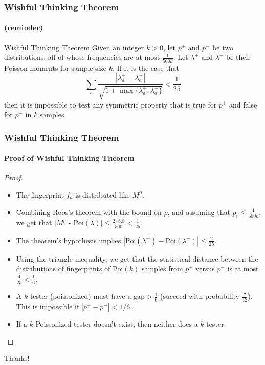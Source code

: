 \documentclass{beamer}
\begin{document}
\begin{frame}
  \frametitle{Wishful Thinking Theorem} \framesubtitle{(reminder)}

  \begin{block}{Wishful Thinking Theorem}
    Given an integer $k>0$, let $p^+$ and $p^-$ be two distributions,
    all of whose frequencies are at most $\frac{1}{500k}$. Let
    $\lambda^+$ and $\lambda^-$ be their Poisson moments for sample
    size $k$. If it is the case that
    \begin{equation*}
      \sum_a\frac{|\lambda^+_a-\lambda^-_a|}{\sqrt{1+\max\{\lambda^+_a,\lambda^-_a\}}}<\frac{1}{25}
    \end{equation*}
    then it is impossible to test any symmetric property that is true
    for $p^+$ and false for $p^-$ in $k$ samples.
  \end{block}

\end{frame}


\begin{frame}
  \frametitle{Wishful Thinking Theorem} \framesubtitle{Proof of
    Wishful Thinking Theorem}  
    
    \begin{proof}
    \begin{itemize}
    \item<1-> The fingerprint $f_a$ is distributed like $M^\rho$.
    \item<2-> Combining Roos's theorem with the bound on $\rho$, and
      assuming that $p_i\le\frac{1}{500k}$, we get that $|M^\rho$ -
      $\mbox{Poi}(\lambda)|\le \frac{2\cdot 8.8}{500}<\frac{1}{25}$.
    \item<3-> The theorem's hypothesis implies
      $|\mbox{Poi}(\lambda^+)-\mbox{Poi}(\lambda^-)|\le\frac{2}{25}$.
    \item<4-> Using the triangle inequality, we get that the
      statistical distance between the distributions of fingerprints
      of $\mbox{Poi}(k)$ samples from $p^+$ versus $p^-$ is at most
      $\frac{4}{25}<\frac{1}{6}$.
    \item<5-> A $k$-tester (poissonized) must have a gap$>\frac{1}{6}$
      (succeed with probability $\frac{7}{12}$). This is impossible if
      $|p^+-p^-|<1/6$.
    \item<6-> If a $k$-Poissonized tester doesn't exist, then neither
      does a $k$-tester.
    \end{itemize}
    \end{proof}
\end{frame}

\begin{frame}
  Thanks!
\end{frame}
\end{document}
